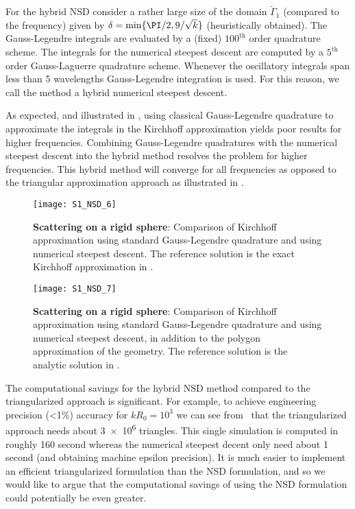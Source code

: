 For the hybrid NSD consider a rather large size of the domain $\tilde{\Gamma}_1$ (compared to the frequency) given by ${\delta = \min\{\PI/2,9/\sqrt{k}\}}$ (heuristically obtained). The Gauss-Legendre integrals are evaluated by a (fixed) $100^{\mathrm{th}}$ order quadrature scheme. The integrals for the numerical steepest descent are computed by a $5^{\mathrm{th}}$ order Gauss-Laguerre quadrature scheme. Whenever the oscillatory integrals span less than 5 wavelengths Gauss-Legendre integration is used. For this reason, we call the method a hybrid numerical steepest descent.

As expected, and illustrated in , using classical Gauss-Legendre quadrature to approximate the integrals in the Kirchhoff approximation yields poor results for higher frequencies. Combining Gauss-Legendre quadratures with the numerical steepest descent into the hybrid method resolves the problem for higher frequencies. This hybrid method will converge for all frequencies as opposed to the triangular approximation approach as illustrated in .

\begin{figure}
	\centering
	\texttt{[image: S1\_NSD\_6]}
	\caption{\textbf{Scattering on a rigid sphere}: Comparison of Kirchhoff approximation using standard Gauss-Legendre quadrature and using numerical steepest descent. The reference solution is the exact Kirchhoff approximation in .}
	\label{Fig4:gaussVSnsd}
\end{figure}
\begin{figure}
	\centering
	\texttt{[image: S1\_NSD\_7]}
	\caption{\textbf{Scattering on a rigid sphere}: Comparison of Kirchhoff approximation using standard Gauss-Legendre quadrature and using numerical steepest descent, in addition to the polygon approximation of the geometry. The reference solution is the analytic solution in .}
	\label{Fig4:gaussVSnsd2}
\end{figure}

The computational savings for the hybrid NSD method compared to the triangularized approach is significant. For example, to achieve engineering precision (\textless 1\%) accuracy for $kR_0=10^3$ we can see from~ that the triangularized approach needs about \num{3e6} triangles. This single simulation is computed in roughly 160 second whereas the numerical steepest decent only need about 1 second (and obtaining machine epsilon precision). It is much easier to implement an efficient triangularized formulation than the NSD formulation, and so we would like to argue that the computational savings of using the NSD formulation could potentially be even greater.